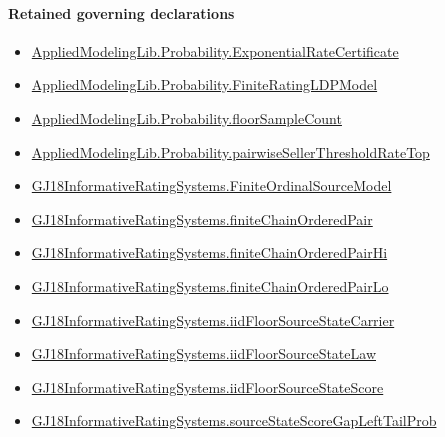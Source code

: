 \documentclass[10pt]{article}
\begin{document}
\paragraph{Retained governing declarations}
\begin{itemize}\raggedright
\item \hyperlink{governing-declaration-330a08568e50e95e}{Applied\allowbreak{}Modeling\allowbreak{}Lib.\allowbreak{}Probability.\allowbreak{}Exponential\allowbreak{}Rate\allowbreak{}Certificate}
\item \hyperlink{governing-declaration-765e92a42a7a9947}{Applied\allowbreak{}Modeling\allowbreak{}Lib.\allowbreak{}Probability.\allowbreak{}Finite\allowbreak{}Rating\allowbreak{}LDP\allowbreak{}Model}
\item \hyperlink{library-prerequisite-b01059f5e405e09c}{Applied\allowbreak{}Modeling\allowbreak{}Lib.\allowbreak{}Probability.\allowbreak{}floor\allowbreak{}Sample\allowbreak{}Count}
\item \hyperlink{governing-declaration-f71e26890ae5348a}{Applied\allowbreak{}Modeling\allowbreak{}Lib.\allowbreak{}Probability.\allowbreak{}pairwise\allowbreak{}Seller\allowbreak{}Threshold\allowbreak{}Rate\allowbreak{}Top}
\item \hyperlink{governing-declaration-9d70577d8e1f92b4}{GJ18\allowbreak{}Informative\allowbreak{}Rating\allowbreak{}Systems.\allowbreak{}Finite\allowbreak{}Ordinal\allowbreak{}Source\allowbreak{}Model}
\item \hyperlink{governing-declaration-490763321205956c}{GJ18\allowbreak{}Informative\allowbreak{}Rating\allowbreak{}Systems.\allowbreak{}finite\allowbreak{}Chain\allowbreak{}Ordered\allowbreak{}Pair}
\item \hyperlink{governing-declaration-715e676f85beb410}{GJ18\allowbreak{}Informative\allowbreak{}Rating\allowbreak{}Systems.\allowbreak{}finite\allowbreak{}Chain\allowbreak{}Ordered\allowbreak{}Pair\allowbreak{}Hi}
\item \hyperlink{governing-declaration-6d4a53d73be0eb55}{GJ18\allowbreak{}Informative\allowbreak{}Rating\allowbreak{}Systems.\allowbreak{}finite\allowbreak{}Chain\allowbreak{}Ordered\allowbreak{}Pair\allowbreak{}Lo}
\item \hyperlink{governing-declaration-70ff3320c885dbc0}{GJ18\allowbreak{}Informative\allowbreak{}Rating\allowbreak{}Systems.\allowbreak{}iid\allowbreak{}Floor\allowbreak{}Source\allowbreak{}State\allowbreak{}Carrier}
\item \hyperlink{governing-declaration-d95c2e3ca64a056a}{GJ18\allowbreak{}Informative\allowbreak{}Rating\allowbreak{}Systems.\allowbreak{}iid\allowbreak{}Floor\allowbreak{}Source\allowbreak{}State\allowbreak{}Law}
\item \hyperlink{governing-declaration-a4b741138dce5934}{GJ18\allowbreak{}Informative\allowbreak{}Rating\allowbreak{}Systems.\allowbreak{}iid\allowbreak{}Floor\allowbreak{}Source\allowbreak{}State\allowbreak{}Score}
\item \hyperlink{governing-declaration-011e1b166ed33821}{GJ18\allowbreak{}Informative\allowbreak{}Rating\allowbreak{}Systems.\allowbreak{}source\allowbreak{}State\allowbreak{}Score\allowbreak{}Gap\allowbreak{}Left\allowbreak{}Tail\allowbreak{}Prob}
\end{itemize}
\end{document}
